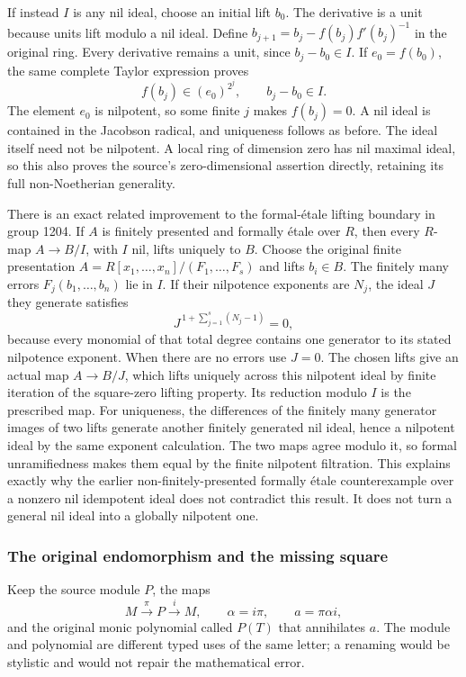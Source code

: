 If instead \(I\) is any nil ideal, choose an initial lift \(b_0\). The derivative is a unit because units lift modulo a nil ideal. Define \(b_{j+1}=b_j-f(b_j)f'(b_j)^{-1}\) in the original ring. Every derivative remains a unit, since \(b_j-b_0\in I\). If \(e_0=f(b_0)\), the same complete Taylor expression proves \[
f(b_j)\in(e_0)^{2^j},\qquad b_j-b_0\in I .
\] The element \(e_0\) is nilpotent, so some finite \(j\) makes \(f(b_j)=0\). A nil ideal is contained in the Jacobson radical, and uniqueness follows as before. The ideal itself need not be nilpotent. A local ring of dimension zero has nil maximal ideal, so this also proves the source's zero-dimensional assertion directly, retaining its full non-Noetherian generality.

There is an exact related improvement to the formal-étale lifting boundary in group 1204. If \(A\) is finitely presented and formally étale over \(R\), then every \(R\)-map \(A\to B/I\), with \(I\) nil, lifts uniquely to \(B\). Choose the original finite presentation \(A=R[x_1,\ldots,x_n]/(F_1,\ldots,F_s)\) and lifts \(b_i\in B\). The finitely many errors \(F_j(b_1,\ldots,b_n)\) lie in \(I\). If their nilpotence exponents are \(N_j\), the ideal \(J\) they generate satisfies \[
J^{\,1+\sum_{j=1}^s(N_j-1)}=0,
\] because every monomial of that total degree contains one generator to its stated nilpotence exponent. When there are no errors use \(J=0\). The chosen lifts give an actual map \(A\to B/J\), which lifts uniquely across this nilpotent ideal by finite iteration of the square-zero lifting property. Its reduction modulo \(I\) is the prescribed map. For uniqueness, the differences of the finitely many generator images of two lifts generate another finitely generated nil ideal, hence a nilpotent ideal by the same exponent calculation. The two maps agree modulo it, so formal unramifiedness makes them equal by the finite nilpotent filtration. This explains exactly why the earlier non-finitely-presented formally étale counterexample over a nonzero nil idempotent ideal does not contradict this result. It does not turn a general nil ideal into a globally nilpotent one.

\subsubsection{The original endomorphism and the missing square}\label{the-original-endomorphism-and-the-missing-square}

Keep the source module \(P\), the maps \[
M\xrightarrow{\pi}P\xrightarrow{i}M,\qquad
\alpha=i\pi,\qquad a=\pi\alpha i,
\] and the original monic polynomial called \(P(T)\) that annihilates \(a\). The module and polynomial are different typed uses of the same letter; a renaming would be stylistic and would not repair the mathematical error.

